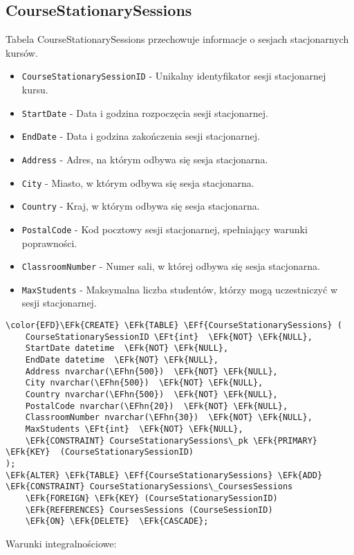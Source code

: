 \documentclass[11pt]{article}
\newcommand{\EFk}[1]{\textcolor{EFk}{\textbf{#1}}} %
\newcommand{\EFf}[1]{\textcolor{EFf}{#1}} %
\newcommand{\EFt}[1]{\textcolor{EFt}{\textbf{#1}}} %
\newcommand{\EFhn}[1]{\textcolor{EFhn}{#1}} %
\begin{document}
\subsection{CourseStationarySessions}
\label{sec:org029541e}
Tabela CourseStationarySessions przechowuje informacje o sesjach stacjonarnych kursów.
\begin{itemize}
\item \texttt{CourseStationarySessionID} - Unikalny identyfikator sesji stacjonarnej kursu.
\item \texttt{StartDate} - Data i godzina rozpoczęcia sesji stacjonarnej.
\item \texttt{EndDate} - Data i godzina zakończenia sesji stacjonarnej.
\item \texttt{Address} - Adres, na którym odbywa się sesja stacjonarna.
\item \texttt{City} - Miasto, w którym odbywa się sesja stacjonarna.
\item \texttt{Country} - Kraj, w którym odbywa się sesja stacjonarna.
\item \texttt{PostalCode} - Kod pocztowy sesji stacjonarnej, spełniający warunki poprawności.
\item \texttt{ClassroomNumber} - Numer sali, w której odbywa się sesja stacjonarna.
\item \texttt{MaxStudents} - Maksymalna liczba studentów, którzy mogą uczestniczyć w sesji stacjonarnej.
\end{itemize}
\begin{Code}
\begin{Verbatim}
\color{EFD}\EFk{CREATE} \EFk{TABLE} \EFf{CourseStationarySessions} (
    CourseStationarySessionID \EFt{int}  \EFk{NOT} \EFk{NULL},
    StartDate datetime  \EFk{NOT} \EFk{NULL},
    EndDate datetime  \EFk{NOT} \EFk{NULL},
    Address nvarchar(\EFhn{500})  \EFk{NOT} \EFk{NULL},
    City nvarchar(\EFhn{500})  \EFk{NOT} \EFk{NULL},
    Country nvarchar(\EFhn{500})  \EFk{NOT} \EFk{NULL},
    PostalCode nvarchar(\EFhn{20})  \EFk{NOT} \EFk{NULL},
    ClassroomNumber nvarchar(\EFhn{30})  \EFk{NOT} \EFk{NULL},
    MaxStudents \EFt{int}  \EFk{NOT} \EFk{NULL},
    \EFk{CONSTRAINT} CourseStationarySessions\_pk \EFk{PRIMARY} \EFk{KEY}  (CourseStationarySessionID)
);
\EFk{ALTER} \EFk{TABLE} \EFf{CourseStationarySessions} \EFk{ADD} \EFk{CONSTRAINT} CourseStationarySessions\_CoursesSessions
    \EFk{FOREIGN} \EFk{KEY} (CourseStationarySessionID)
    \EFk{REFERENCES} CoursesSessions (CourseSessionID)
    \EFk{ON} \EFk{DELETE}  \EFk{CASCADE};
\end{Verbatim}
\end{Code}
Warunki integralnościowe:
\end{document}
